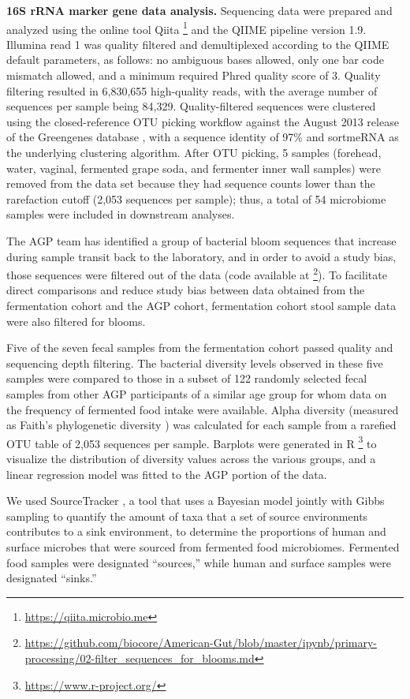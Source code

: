 \textbf{16S rRNA marker gene data analysis.} Sequencing data were prepared and analyzed
using the online tool Qiita \footnote{\url{https://qiita.microbio.me}} and the QIIME
pipeline \cite{Caporaso2010} version 1.9. Illumina read 1 was quality filtered and
demultiplexed according to the QIIME default parameters, as follows: no ambiguous bases
allowed, only one bar code mismatch allowed, and a minimum required Phred quality score of 3.
Quality filtering resulted in 6,830,655 high-quality reads, with the average number of
sequences per sample being 84,329. Quality-filtered sequences were clustered using
the closed-reference OTU picking workflow against the August 2013 release of the Greengenes
database \cite{DeSantis2006}, with a sequence identity of 97\% and sortmeRNA \cite{Kopylova2012}
as the underlying clustering algorithm. After OTU picking, 5 samples (forehead, water,
vaginal, fermented grape soda, and fermenter inner wall samples) were removed from the
data set because they had sequence counts lower than the rarefaction cutoff (2,053
sequences per sample); thus, a total of 54 microbiome samples were included in downstream analyses.

The AGP team has identified a group of bacterial bloom sequences that increase
during sample transit back to the laboratory, and in order to avoid a study bias,
those sequences were filtered out of the data (code available at \footnote{\url{https://github.com/biocore/American-Gut/blob/master/ipynb/primary-processing/02-filter_sequences\_for\_blooms.md}}).
To facilitate direct comparisons and reduce study bias between data obtained from
the fermentation cohort and the AGP cohort, fermentation cohort stool sample
data were also filtered for blooms.

Five of the seven fecal samples from the fermentation cohort passed quality and
sequencing depth filtering. The bacterial diversity levels observed in these five
samples were compared to those in a subset of 122 randomly selected fecal samples
from other AGP participants of a similar age group for whom data on the frequency
of fermented food intake were available. Alpha diversity (measured as Faith’s
phylogenetic diversity \cite{Faith1992}) was calculated for each sample from a
rarefied OTU table of 2,053 sequences per sample. Barplots were generated in
R \footnote{\url{https://www.r-project.org/}} to visualize the distribution of
diversity values across the various groups, and a linear regression model was
fitted to the AGP portion of the data.

We used SourceTracker \cite{Knights2011}, a tool that uses a Bayesian model
jointly with Gibbs sampling to quantify the amount of taxa that a set of source
environments contributes to a sink environment, to determine the proportions of
human and surface microbes that were sourced from fermented food microbiomes.
Fermented food samples were designated “sources,” while human and surface samples
were designated “sinks.”

